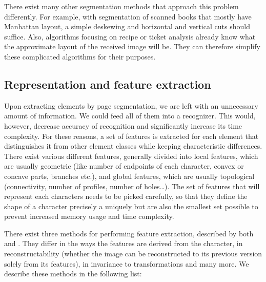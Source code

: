 There exist many other segmentation methods that approach this problem differently. For example, with segmentation of scanned books that mostly have Manhattan layout, a simple deskewing and horizontal and vertical cuts should suffice. Also, algorithms focusing on recipe or ticket analysis already know what the approximate layout of the received image will be. They can therefore simplify these complicated algorithms for their purposes.

\subsection{Representation and feature extraction}

Upon extracting elements by page segmentation, we are left with an unnecessary amount of information. We could feed all of them into a recognizer. This would, however, decrease accuracy of recognition and significantly increase its time complexity. For these reasons, a set of features is extracted for each element that distinguishes it from other element classes while keeping characteristic differences. There exist various different features, generally divided into local features, which are usually geometric (like number of endpoints of each character, convex or concave parts, branches etc.), and global features, which are usually topological (connectivity, number of profiles, number of holes\ldots). The set of features that will represent each characters needs to be picked carefully, so that they define the shape of a character precisely a uniquely but are also the smallest set possible to prevent increased memory usage and time complexity.

There exist three methods for performing feature extraction, described by both \citet{featureExtractionBook} and \citet{featureExtractiontext}. They differ in the ways the features are derived from the character, in reconstructability (whether the image can be reconstructed to its previous version solely from its features), in invariance to transformations and many more. We describe these methods in the following list:

